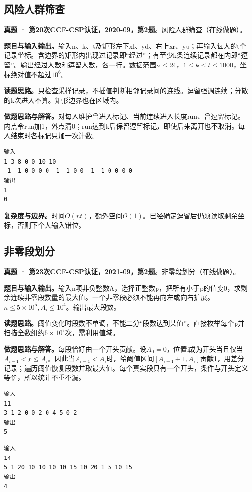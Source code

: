 \subsection{风险人群筛查}
\textbf{真题 · 第20次CCF-CSP认证，2020-09，第2题。}\href{https://www.acwing.com/problem/content/3296/}{风险人群筛查（在线做题）}。

\noindent\textbf{题目与输入输出。}输入n、k、t及矩形左下xl、yd、右上xr、yu；再输入每人的t个记录坐标。含边界的矩形内出现过记录即“经过”；有至少k条连续记录都在内即“逗留”。输出经过人数和逗留人数，各一行。数据范围$n\le24$，$1\le k\le t\le1000$，坐标绝对值不超过$10^6$。

\noindent\textbf{读题思路。}只检查采样记录，不插值判断相邻记录间的连线。逗留强调连续；分散的k次进入不算。矩形边界也在区域内。

\noindent\textbf{做题思路与解答。}对每人维护曾进入标记、当前连续进入长度run、曾逗留标记。内点令run加1，外点清0；run达到k后保留逗留标记，即使后来离开也不取消。每人结束时各标记只加一次计数。
\begin{verbatim}
输入
1 3 8 0 0 10 10
-1 -1 0 0 0 0 -1 -1 0 0 -1 -1 0 0 0 0
输出
1
0
\end{verbatim}

\noindent\textbf{复杂度与边界。}时间$O(nt)$，额外空间$O(1)$。已经确定逗留后仍须读取剩余坐标，否则下个人输入错位。
\subsection{非零段划分}
\textbf{真题 · 第23次CCF-CSP认证，2021-09，第2题。}\href{https://www.acwing.com/problem/content/4010/}{非零段划分（在线做题）}。

\noindent\textbf{题目与输入输出。}输入n项非负整数A，选择正整数p，把所有小于p的值变0，求剩余连续非零段数量的最大值。一个非零段必须不能再向左或向右扩展。$n\le5\times10^5,A_i\le10^4$。输出最大段数。

\noindent\textbf{读题思路。}阈值变化时段数不单调，不能二分“段数达到某值”。直接枚举每个p并扫描全数组约$5\times10^9$次，需利用值域。

\noindent\textbf{做题思路与解答。}每段恰好由一个开头贡献。设$A_0=0$，位置i成为开头当且仅当$A_{i-1}<p\le A_i$。因此当$A_{i-1}<A_i$时，给阈值区间$[A_{i-1}+1,A_i]$贡献1，用差分记录；遍历阈值恢复段数并取最大值。每个真实段只有一个开头，条件与开头定义等价，所以统计不重不漏。
\begin{verbatim}
输入
11
3 1 2 0 0 2 0 4 5 0 2
输出
5
\end{verbatim}
\begin{verbatim}
输入
14
5 1 20 10 10 10 10 15 10 20 1 5 10 15
输出
4
\end{verbatim}


